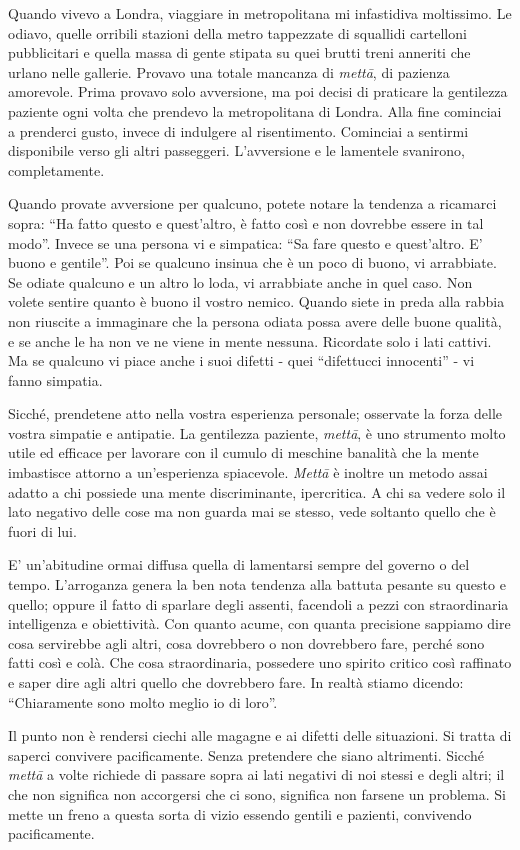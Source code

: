 Quando vivevo a Londra, viaggiare in metropolitana mi infastidiva
moltissimo. Le odiavo, quelle orribili stazioni della metro tappezzate
di squallidi cartelloni pubblicitari e quella massa di gente stipata su
quei brutti treni anneriti che urlano nelle gallerie. Provavo una totale
mancanza di \textit{mettā}, di pazienza amorevole. Prima provavo solo avversione,
ma poi decisi di praticare la gentilezza paziente ogni volta che
prendevo la metropolitana di Londra. Alla fine cominciai a prenderci
gusto, invece di indulgere al risentimento. Cominciai a sentirmi
disponibile verso gli altri passeggeri. L'avversione e le lamentele
svanirono, completamente.

Quando provate avversione per qualcuno, potete notare la tendenza a
ricamarci sopra: ``Ha fatto questo e quest'altro, è fatto così e non
dovrebbe essere in tal modo''. Invece se una persona vi e simpatica: ``Sa
fare questo e quest'altro. E' buono e gentile''. Poi se qualcuno insinua
che è un poco di buono, vi arrabbiate. Se odiate qualcuno e un altro lo
loda, vi arrabbiate anche in quel caso. Non volete sentire quanto è
buono il vostro nemico. Quando siete in preda alla rabbia non riuscite a
immaginare che la persona odiata possa avere delle buone qualità, e se
anche le ha non ve ne viene in mente nessuna. Ricordate solo i lati
cattivi. Ma se qualcuno vi piace anche i suoi difetti - quei ``difettucci
innocenti'' - vi fanno simpatia.

Sicché, prendetene atto nella vostra esperienza personale; osservate la
forza delle vostra simpatie e antipatie. La gentilezza paziente, \textit{mettā},
è uno strumento molto utile ed efficace per lavorare con il cumulo di
meschine banalità che la mente imbastisce attorno a un'esperienza
spiacevole. \textit{Mettā} è inoltre un metodo assai adatto a chi possiede una
mente discriminante, ipercritica. A chi sa vedere solo il lato negativo
delle cose ma non guarda mai se stesso, vede soltanto quello che è fuori
di lui.

E' un'abitudine ormai diffusa quella di lamentarsi sempre del governo o
del tempo. L'arroganza genera la ben nota tendenza alla battuta pesante
su questo e quello; oppure il fatto di sparlare degli assenti, facendoli
a pezzi con straordinaria intelligenza e obiettività. Con quanto acume,
con quanta precisione sappiamo dire cosa servirebbe agli altri, cosa
dovrebbero o non dovrebbero fare, perché sono fatti così e colà. Che
cosa straordinaria, possedere uno spirito critico così raffinato e saper
dire agli altri quello che dovrebbero fare. In realtà stiamo dicendo:
``Chiaramente sono molto meglio io di loro''.

Il punto non è rendersi ciechi alle magagne e ai difetti delle
situazioni. Si tratta di saperci convivere pacificamente. Senza
pretendere che siano altrimenti. Sicché \textit{mettā} a volte richiede di
passare sopra ai lati negativi di noi stessi e degli altri; il che non
significa non accorgersi che ci sono, significa non farsene un problema.
Si mette un freno a questa sorta di vizio essendo gentili e pazienti,
convivendo pacificamente.

